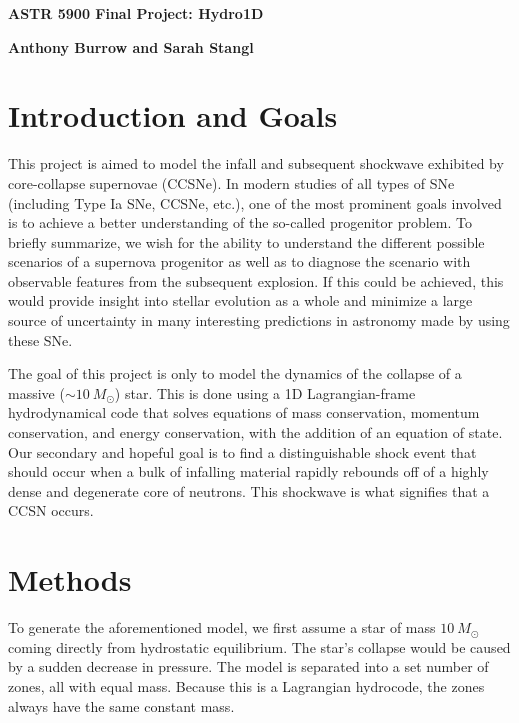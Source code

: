 \documentclass[12pt]{article}
\begin{document}
\begin{center}\begin{LARGE}
\textbf{ASTR 5900 Final Project: Hydro1D}
\end{LARGE}\end{center}

\begin{center}
\textbf{Anthony Burrow and Sarah Stangl}
\end{center}

\section{Introduction and Goals}

This project is aimed to model the infall and subsequent shockwave exhibited by
core-collapse supernovae (CCSNe). In modern studies of all types of SNe
(including Type Ia SNe, CCSNe, etc.), one of the most prominent goals involved
is to achieve a better understanding of the so-called progenitor problem. To
briefly summarize, we wish for the ability to understand the different possible
scenarios of a supernova progenitor as well as to diagnose the scenario with
observable features from the subsequent explosion. If this could be achieved,
this would provide insight into stellar evolution as a whole and minimize a
large source of uncertainty in many interesting predictions in astronomy made
by using these SNe.

The goal of this project is only to model the dynamics of the collapse of a
massive ($\sim10\ M_\odot$) star. This is done using a 1D Lagrangian-frame
hydrodynamical code that solves equations of mass conservation, momentum
conservation, and energy conservation, with the addition of an equation of
state. Our secondary and hopeful goal is to find a distinguishable shock event
that should occur when a bulk of infalling material rapidly rebounds off of a
highly dense and degenerate core of neutrons. This shockwave is what signifies
that a CCSN occurs.

\section{Methods}

To generate the aforementioned model, we first assume a star of mass
$10\ M_\odot$ coming directly from hydrostatic equilibrium. The star's collapse
would be caused by a sudden decrease in pressure. The model is separated into a
set number of zones, all with equal mass. Because this is a Lagrangian
hydrocode, the zones always have the same constant mass.
\end{document}
